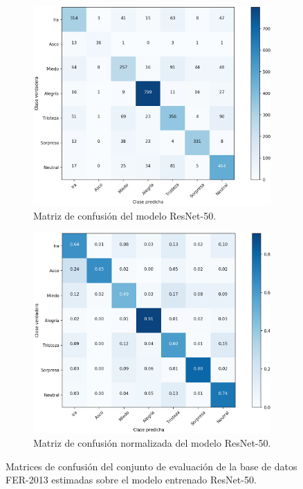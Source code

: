 \begin{figure}
    \centering
    \begin{subfigure}[t]{\textwidth}
      \centering
      \includegraphics[width=0.7\linewidth]{Images/ResNet-50_matrix.png}
      \caption{Matriz de confusión del modelo ResNet-50.}
      \label{fig:ResNet-50_matrix}
    \end{subfigure}
    
    \vspace{1cm}
    \begin{subfigure}[t]{\textwidth}
      \centering
      \includegraphics[width=0.7\linewidth]{Images/ResNet-50_matrix_norm.png}
      \caption{Matriz de confusión normalizada del modelo ResNet-50.}
      \label{fig:ResNet-50_matrix_norm}
    \end{subfigure}
    \caption{Matrices de confusión del conjunto de evaluación de la base de datos FER-2013 estimadas sobre el modelo entrenado ResNet-50.}
    \label{fig:ResNet-50_matrices}
\end{figure}